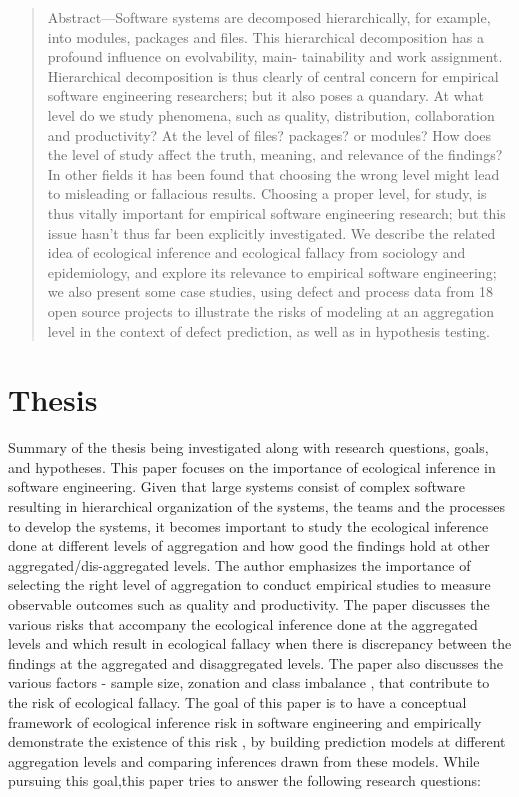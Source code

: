 \documentclass[12pt]{article}
\begin{document}
\maketitle

\begin{abstract}
Abstract—Software systems are decomposed hierarchically, for
example, into modules, packages and files. This hierarchical
decomposition has a profound influence on evolvability, main-
tainability and work assignment. Hierarchical decomposition is
thus clearly of central concern for empirical software engineering
researchers; but it also poses a quandary. At what level do we
study phenomena, such as quality, distribution, collaboration and
productivity? At the level of files? packages? or modules? How
does the level of study affect the truth, meaning, and relevance
of the findings? In other fields it has been found that choosing
the wrong level might lead to misleading or fallacious results.
Choosing a proper level, for study, is thus vitally important for
empirical software engineering research; but this issue hasn’t
thus far been explicitly investigated. We describe the related idea
of ecological inference and ecological fallacy from sociology and
epidemiology, and explore its relevance to empirical software
engineering; we also present some case studies, using defect and
process data from 18 open source projects to illustrate the risks
of modeling at an aggregation level in the context of defect
prediction, as well as in hypothesis testing.
\end{abstract}

\section{Thesis}\label{thesis}
Summary of the thesis being investigated along with research questions, goals, and hypotheses.
This paper focuses on the importance of ecological inference in software engineering. Given that large systems consist of complex software
resulting in hierarchical organization of the systems, the teams and the processes to develop the systems, it becomes important to study the ecological inference
done at different levels of aggregation and how good the findings hold at other aggregated/dis-aggregated levels. The author emphasizes the importance of selecting the 
right level of aggregation to conduct empirical studies to measure observable outcomes such as quality and productivity. The paper discusses the various risks that accompany the 
ecological inference done at the aggregated levels and which result in ecological fallacy when there is discrepancy between the findings at the aggregated and disaggregated levels. The
paper also discusses the various factors - sample size, zonation and class imbalance , that contribute to the risk of ecological fallacy.
  The goal of this paper is to have a conceptual framework of ecological inference risk in software engineering and empirically demonstrate the existence of this risk , by building
  prediction models at different aggregation levels and comparing inferences drawn from these models. While pursuing this goal,this paper tries to answer the following research questions:
\end{document}

